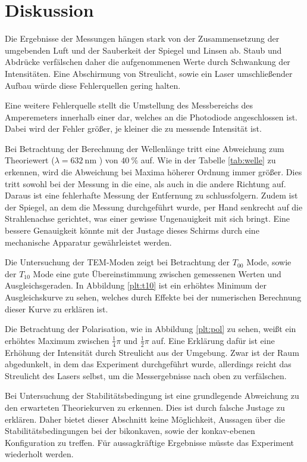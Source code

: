 \newpage
\section{Diskussion}
Die Ergebnisse der Messungen hängen stark von der Zusammensetzung der umgebenden
Luft und der Sauberkeit der Spiegel und Linsen ab. Staub und Abdrücke verfälschen
daher die aufgenommenen Werte durch Schwankung der Intensitäten. Eine
Abschirmung von Streulicht, sowie ein Laser umschließender Aufbau würde diese
Fehlerquellen gering halten.

Eine weitere Fehlerquelle stellt die Umstellung des Messbereichs des
Amperemeters innerhalb einer dar, welches an die Photodiode angeschlossen ist.
Dabei wird der Fehler größer, je kleiner die zu messende Intensität ist.

Bei Betrachtung der Berechnung der Wellenlänge tritt eine Abweichung zum
Theoriewert ($\lambda = \SI{632}{\nano\meter}$ \cite{anleitung}) von
$\SI{40}{\percent}$ auf. Wie in der Tabelle \ref{tab:welle} zu erkennen,
wird die Abweichung bei Maxima höherer Ordnung immer größer. Dies tritt sowohl
bei der Messung in die eine, als auch in die andere Richtung auf. Daraus ist eine
fehlerhafte Messung der Entfernung zu schlussfolgern. Zudem ist der Spiegel, an
dem die Messung durchgeführt wurde, per Hand senkrecht auf die Strahlenachse
gerichtet, was einer gewisse Ungenauigkeit mit sich bringt. Eine bessere Genauigkeit könnte
mit der Justage dieses Schirms durch eine mechanische Apparatur gewährleistet
werden.

Die Untersuchung der TEM-Moden zeigt bei Betrachtung der $T_{00}$ Mode, sowie
der $T_{10}$ Mode eine gute Übereinstimmung zwischen gemessenen Werten und
Ausgleichsgeraden. In Abbildung \ref{plt:t10} ist ein erhöhtes Minimum der
Ausgleichskurve zu sehen, welches durch Effekte bei der numerischen Berechnung
dieser Kurve zu erklären ist.

Die Betrachtung der Polarisation, wie in Abbildung \ref{plt:pol} zu sehen, weißt
ein erhöhtes Maximum zwischen $\frac{1}{4}\pi$ und $\frac{1}{2}\pi$ auf. Eine
Erklärung dafür ist eine Erhöhung der Intensität durch Streulicht aus der
Umgebung. Zwar ist der Raum abgedunkelt, in dem das Experiment durchgeführt wurde,
allerdings reicht das Streulicht des Lasers selbst, um die
Messergebnisse nach oben zu verfälschen.

Bei Untersuchung der Stabilitätsbedingung ist eine grundlegende
Abweichung zu den erwarteten Theoriekurven zu erkennen.
Dies ist durch falsche Justage zu erklären.
Daher bietet dieser Abschnitt keine Möglichkeit, Aussagen über die
Stabilitätsbedingungen bei der bikonkaven, sowie der konkav-ebenen Konfiguration
zu treffen. Für aussagkräftige Ergebnisse müsste das Experiment
wiederholt werden.

